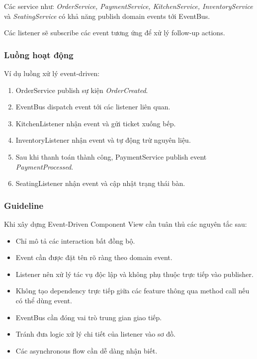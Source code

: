 Các service như:
\textit{OrderService, PaymentService, KitchenService, InventoryService} và \textit{SeatingService}
có khả năng publish domain events tới EventBus.

Các listener sẽ subscribe các event tương ứng để xử lý follow-up actions.

\subsubsection*{Luồng hoạt động}

Ví dụ luồng xử lý event-driven:

\begin{enumerate}
    \item OrderService publish sự kiện \textit{OrderCreated}.
    
    \item EventBus dispatch event tới các listener liên quan.
    
    \item KitchenListener nhận event và gửi ticket xuống bếp.
    
    \item InventoryListener nhận event và tự động trừ nguyên liệu.
    
    \item Sau khi thanh toán thành công, PaymentService publish event \textit{PaymentProcessed}.
    
    \item SeatingListener nhận event và cập nhật trạng thái bàn.
\end{enumerate}

\subsubsection*{Guideline}

Khi xây dựng Event-Driven Component View cần tuân thủ các nguyên tắc sau:

\begin{itemize}
    \item Chỉ mô tả các interaction bất đồng bộ.
    
    \item Event cần được đặt tên rõ ràng theo domain event.
    
    \item Listener nên xử lý tác vụ độc lập và không phụ thuộc trực tiếp vào publisher.
    
    \item Không tạo dependency trực tiếp giữa các feature thông qua method call nếu có thể dùng event.
    
    \item EventBus cần đóng vai trò trung gian giao tiếp.
    
    \item Tránh đưa logic xử lý chi tiết của listener vào sơ đồ.
    
    \item Các asynchronous flow cần dễ dàng nhận biết.
\end{itemize}

